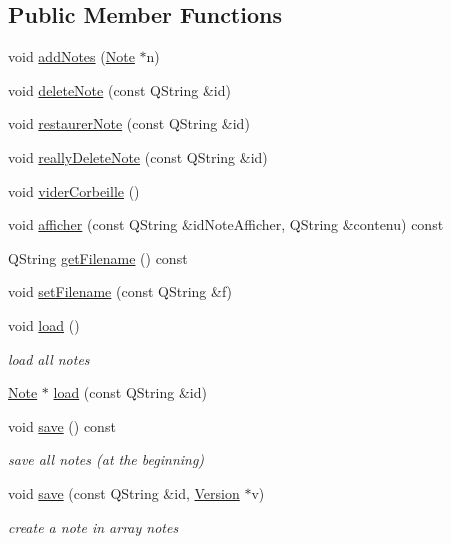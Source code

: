 \subsection*{Public Member Functions}
\begin{DoxyCompactItemize}
\item 
void \hyperlink{classNotesManager_af603aa285213c1ae667c65e97eb63ce3}{add\+Notes} (\hyperlink{classNote}{Note} $\ast$n)
\item 
void \hyperlink{classNotesManager_a989429244c36c35ef68204f6ae2a0a5f}{delete\+Note} (const Q\+String \&id)
\item 
void \hyperlink{classNotesManager_a517a77d36ccefd26d197f0fce26adc74}{restaurer\+Note} (const Q\+String \&id)
\item 
void \hyperlink{classNotesManager_ab050fc2721a9e75aa0eca11496aa787e}{really\+Delete\+Note} (const Q\+String \&id)
\item 
void \hyperlink{classNotesManager_a624a4f618af06aaad53ed57dd2e924ad}{vider\+Corbeille} ()
\item 
void \hyperlink{classNotesManager_a4178ff422d1eb1b9693c45e054b37df5}{afficher} (const Q\+String \&id\+Note\+Afficher, Q\+String \&contenu) const 
\item 
Q\+String \hyperlink{classNotesManager_aedbb97d0664b5809fa9af602e9ca47e4}{get\+Filename} () const 
\item 
void \hyperlink{classNotesManager_ad91ac409c3c42399e702a0863d4274b1}{set\+Filename} (const Q\+String \&f)
\item 
void \hyperlink{classNotesManager_ad4fb2de50633dd25b71024343341cd64}{load} ()
\begin{DoxyCompactList}\small\item\em load all notes \end{DoxyCompactList}\item 
\hyperlink{classNote}{Note} $\ast$ \hyperlink{classNotesManager_aae62fb036915ee05b67af6e9d2560d10}{load} (const Q\+String \&id)
\item 
void \hyperlink{classNotesManager_a96c34db9c22dcdde2dfd92286de037e0}{save} () const 
\begin{DoxyCompactList}\small\item\em save all notes (at the beginning) \end{DoxyCompactList}\item 
void \hyperlink{classNotesManager_a7a90adc3eb75c7ace0c634664b8b7ccd}{save} (const Q\+String \&id, \hyperlink{classVersion}{Version} $\ast$v)
\begin{DoxyCompactList}\small\item\em create a note in array notes \end{DoxyCompactList}\item 

\end{DoxyCompactItemize}
